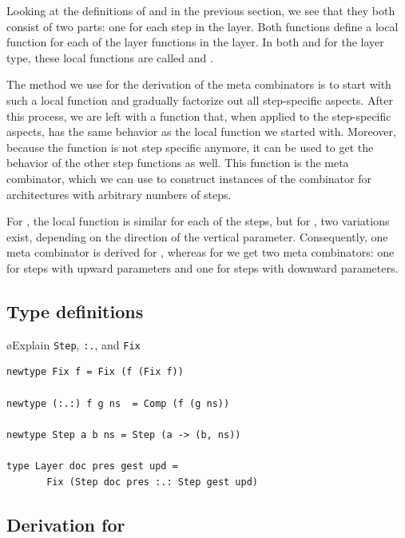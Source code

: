 \documentclass[preprint,natbib]{sigplanconf}
\begin{document}
Looking at the definitions of  and  in the previous section, we see that they both consist of two parts: one for each step in the layer. Both functions define a local function for each of the layer functions in the layer. In both  and  for the  layer type, these local functions are called  and . 

The method we use for the derivation of the meta combinators is to start with such a local function and gradually factorize out all step-specific aspects. After this process, we are left with a function that, when applied to the step-specific aspects, has the same behavior as the local function we started with. Moreover, because the function is not step specific anymore, it can be used to get the behavior of the other step functions as well. This function is the meta combinator, which we can use to construct instances of the combinator for architectures with arbitrary numbers of steps. 

\bc
 For , the local function is similar for each of the steps, but for , two variations exist, depending on the direction of the vertical parameter. Consequently, one meta combinator is derived for , whereas for  we get two meta combinators: one for steps with upward parameters and one for steps with downward parameters.
\ec
 
 
%																
\subsection{Type definitions} \label{subsecttypedef}

\bl
\o Explain \verb|Step|, \verb|:.|, and \verb|Fix|
\el
\begin{small}
\begin{verbatim}
newtype Fix f = Fix (f (Fix f))

newtype (:.:) f g ns  = Comp (f (g ns))

newtype Step a b ns = Step (a -> (b, ns))

type Layer doc pres gest upd = 
       Fix (Step doc pres :.: Step gest upd)
\end{verbatim}
\end{small}


%																
\subsection{Derivation for }
\end{document}

